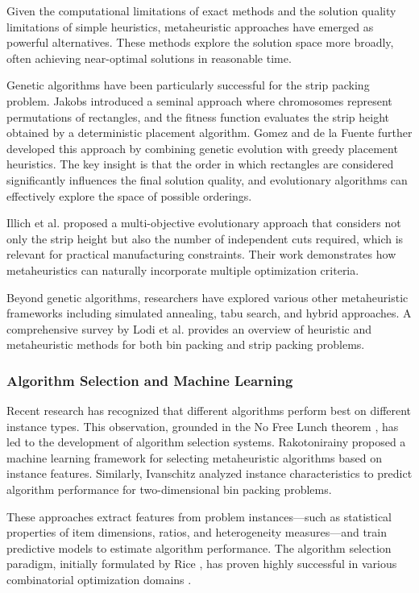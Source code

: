 \documentclass[11pt,a4paper]{article}
\begin{document}
Given the computational limitations of exact methods and the solution quality limitations of simple heuristics, metaheuristic approaches have emerged as powerful alternatives. These methods explore the solution space more broadly, often achieving near-optimal solutions in reasonable time.

Genetic algorithms have been particularly successful for the strip packing problem. Jakobs \cite{jakobs1996} introduced a seminal approach where chromosomes represent permutations of rectangles, and the fitness function evaluates the strip height obtained by a deterministic placement algorithm. Gomez and de la Fuente \cite{gomez1999} further developed this approach by combining genetic evolution with greedy placement heuristics. The key insight is that the order in which rectangles are considered significantly influences the final solution quality, and evolutionary algorithms can effectively explore the space of possible orderings.

Illich et al. \cite{illich2007} proposed a multi-objective evolutionary approach that considers not only the strip height but also the number of independent cuts required, which is relevant for practical manufacturing constraints. Their work demonstrates how metaheuristics can naturally incorporate multiple optimization criteria.

Beyond genetic algorithms, researchers have explored various other metaheuristic frameworks including simulated annealing, tabu search, and hybrid approaches. A comprehensive survey by Lodi et al. \cite{lodi2002} provides an overview of heuristic and metaheuristic methods for both bin packing and strip packing problems.

\subsubsection{Algorithm Selection and Machine Learning}

Recent research has recognized that different algorithms perform best on different instance types. This observation, grounded in the No Free Lunch theorem \cite{wolpert1997}, has led to the development of algorithm selection systems. Rakotonirainy \cite{rakotonirainy2020} proposed a machine learning framework for selecting metaheuristic algorithms based on instance features. Similarly, Ivanschitz \cite{ivanschitz2017} analyzed instance characteristics to predict algorithm performance for two-dimensional bin packing problems.

These approaches extract features from problem instances—such as statistical properties of item dimensions, ratios, and heterogeneity measures—and train predictive models to estimate algorithm performance. The algorithm selection paradigm, initially formulated by Rice \cite{rice1976}, has proven highly successful in various combinatorial optimization domains \cite{xu2008,kerschke2018,kerschke2019}.
\end{document}
